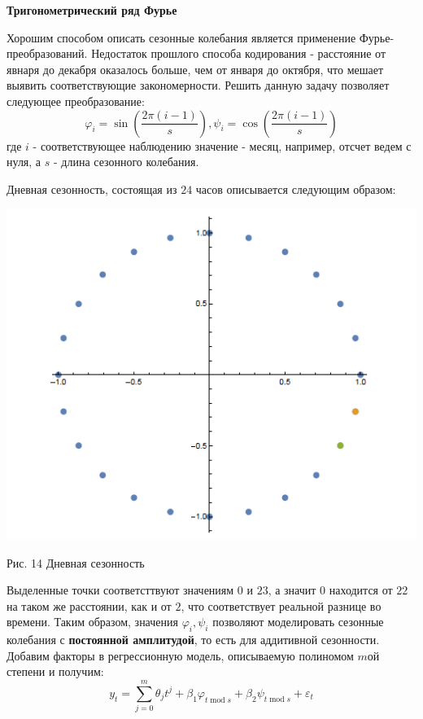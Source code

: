 \documentclass[aps,%
12pt,%
final,%
oneside,
onecolumn,%
musixtex, %
superscriptaddress,%
centertags]{article} %
\theoremstyle{plain}
\theoremstyle{definition}
\theoremstyle{remark}
\begin{document}
\textbf{Тригонометрический ряд Фурье}

Хорошим способом описать сезонные колебания является применение Фурье-преобразований. Недостаток прошлого способа кодирования - расстояние от явнаря до декабря оказалось больше, чем от января до октября, что мешает выявить соответствующие закономерности. Решить данную задачу позволяет следующее преобразование:
$$\varphi_i = \sin \left(\frac{2\pi(i-1)}{s}\right), \psi_i = \cos \left(\frac{2\pi(i-1)}{s}\right)$$
где $i$ - соответствующее наблюдению значение  - месяц, например, отсчет ведем с нуля, а $s$ - длина сезонного колебания.

Дневная сезонность, состоящая из $24$ часов описывается следующим образом:

\begin{center}
	\includegraphics[scale=0.5]{images/14.png}

	Рис. 14 Дневная сезонность
\end{center}

Выделенные точки соответсттвуют значениям $0$ и $23$, а значит $0$ находится от $22$ на таком же расстоянии, как и от $2$, что соответствует реальной разнице во времени. Таким образом, значения $\varphi_i,\psi_i$ позволяют моделировать сезонные колебания с \textbf{постоянной амплитудой}, то есть для аддитивной сезонности. Добавим факторы в регрессионную модель, описываемую полиномом $m$ой степени и получим:
$$y_t = \sum\limits_{j=0}^m \theta_jt^j + \beta_1 \varphi_{t \operatorname{mod} s} + \beta_2 \psi_{t \operatorname{mod} s} + \varepsilon_t$$
\end{document}
